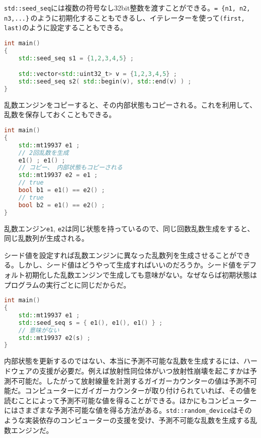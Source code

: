 \texttt{std::seed\_seq}には複数の符号なし32bit整数を渡すことができる。\texttt{= \{n1, n2, n3,...\}}\,のように初期化することもできるし、イテレーターを使って\texttt{(first, last)}のように設定することもできる。

\begin{lstlisting}[language={C++}]
int main()
{
    std::seed_seq s1 = {1,2,3,4,5} ;

    std::vector<std::uint32_t> v = {1,2,3,4,5} ; 
    std::seed_seq s2( std::begin(v), std::end(v) ) ;
}
\end{lstlisting}

乱数エンジンをコピーすると、その内部状態もコピーされる。これを利用して、乱数を保存しておくこともできる。

\begin{lstlisting}[language={C++}]
int main()
{
    std::mt19937 e1 ;
    // 2回乱数を生成
    e1() ; e1() ;
    // コピー、 内部状態もコピーされる
    std::mt19937 e2 = e1 ;
    // true
    bool b1 = e1() == e2() ;
    // true
    bool b2 = e1() == e2() ;
}
\end{lstlisting}

乱数エンジン\texttt{e1}, \texttt{e2}は同じ状態を持っているので、同じ回数乱数生成をすると、同じ乱数列が生成される。


シード値を設定すれば乱数エンジンに異なった乱数列を生成させることができる。しかし、シード値はどうやって生成すればいいのだろうか。シード値をデフォルト初期化した乱数エンジンで生成しても意味がない。なぜならば初期状態はプログラムの実行ごとに同じだからだ。

\begin{lstlisting}[language={C++}]
int main()
{
    std::mt19937 e1 ;
    std::seed_seq s = { e1(), e1(), e1() } ;
    // 意味がない
    std::mt19937 e2(s) ;
}
\end{lstlisting}

内部状態を更新するのではない、本当に予測不可能な乱数を生成するには、ハードウェアの支援が必要だ。例えば放射性同位体がいつ放射性崩壊を起こすかは予測不可能だ。したがって放射線量を計測するガイガーカウンターの値は予測不可能だ。コンピューターにガイガーカウンターが取り付けられていれば、その値を読むことによって予測不可能な値を得ることができる。ほかにもコンピューターにはさまざまな予測不可能な値を得る方法がある。\texttt{std::random\_device}はそのような実装依存のコンピューターの支援を受け、予測不可能な乱数を生成する乱数エンジンだ。


